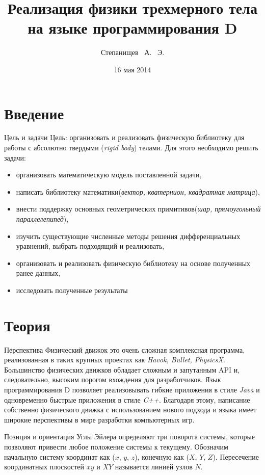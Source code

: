 \documentclass[xetex,12pt,compress,hyperref={xetex}]{beamer}
\author{Степанищев ~А. ~Э.}
\title{Реализация физики трехмерного тела на языке программирования D}
\date{16 мая 2014}
\begin{document}
 \begin{frame}
  \titlepage
 \end{frame}
 
 \section{Введение}
 \begin{frame}{Цель и задачи}
  Цель: организовать и реализовать физическую библиотеку для работы с абсолютно твердыми (\textit{rigid body}) телами.
  Для этого необходимо решить задачи:
  \begin{itemize}
    \item организовать математическую модель поставленной задачи,
    \item написать библиотеку математики(\textit{вектор, кватернион, квадратная матрица}),
    \item внести поддержку основных геометрических примитивов(\textit{шар, прямоугольный параллелепипед}),
    \item изучить существующие численные методы решения дифференциальных уравнений, выбрать подходящий и реализовать,
    \item организовать и реализовать физическую библиотеку на основе полученных ранее данных,
    \item исследовать полученные результаты
  \end{itemize}
 \end{frame}

 \section{Теория} 
 \begin{frame}{Перспектива} 
    Физический движок это очень сложная комплексная программа, реализованная в таких крупных проектах как \textit{Havok, Bullet, PhysicsX}.
    Большинство физических движков обладает сложным и запутанным API и, следовательно, высоким порогом вхождения для разработчиков.
    Язык программирования D позволяет реализовывать гибкие приложения в стиле \textit{Java} и одновременно быстрые приложения в стиле \textit{C++}.
    Благодаря этому, написание собственно физического движка с использованием нового подхода и языка имеет широкие перспективы
    в мире разработки компьютерных игр.
  \end{frame}
 
 \begin{frame}{Позиция и ориентация} 
 Углы Эйлера определяют три поворота системы, которые позволяют привести любое положение системы к текущему.
Обозначим начальную систему координат как ($x$, $y$, $z$), конечную как ($X$, $Y$, $Z$).
Пересечение координатных плоскостей $xy$ и $XY$ называется линией узлов $N$.
 \end{frame}
 
\end{document}
